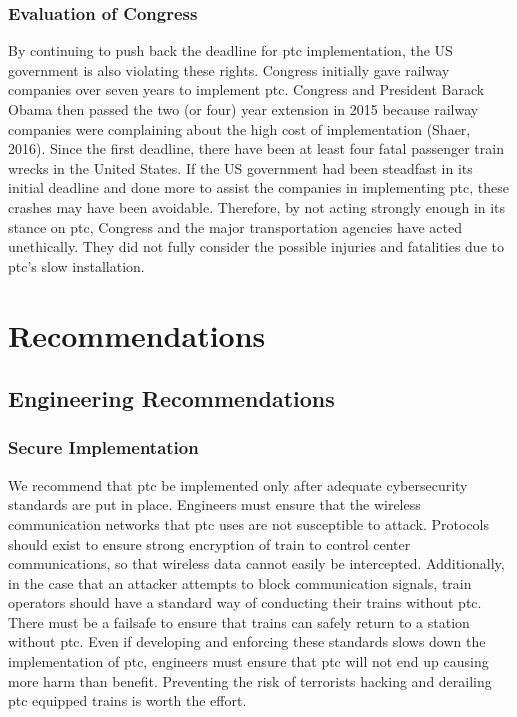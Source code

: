 \documentclass[11pt, titlepage]{article}
\begin{document}
\subsubsection{Evaluation of Congress}

By continuing to push back the deadline for \gls{ptc} implementation, the US
government is also violating these rights. Congress initially gave railway companies
over seven years to implement \gls{ptc}. Congress and President Barack Obama then
passed the two (or four) year extension in 2015 because railway companies were
complaining about the high cost of implementation (Shaer, 2016). Since the first
deadline, there have been at least four fatal passenger train wrecks in the United
States. If the US government had been steadfast in its initial deadline and done
more to assist the companies in implementing \gls{ptc}, these crashes may have been
avoidable. Therefore, by not acting strongly enough in its stance on \gls{ptc},
Congress and the major transportation agencies have acted unethically. They did not
fully consider the possible injuries and fatalities due to \gls{ptc}’s slow
installation.

\pagebreak

\section{Recommendations}

\subsection{Engineering Recommendations}

\subsubsection{Secure Implementation}

We recommend that \gls{ptc} be implemented only after adequate cybersecurity
standards are put in place. Engineers must ensure that the wireless communication
networks that \gls{ptc} uses are not susceptible to attack. Protocols should exist
to ensure strong encryption of train to control center communications, so that
wireless data cannot easily be intercepted. Additionally, in the case that an
attacker attempts to block communication signals, train operators should have a
standard way of conducting their trains without \gls{ptc}. There must be a failsafe
to ensure that trains can safely return to a station without \gls{ptc}. Even if
developing and enforcing these standards slows down the implementation of \gls{ptc},
engineers must ensure that \gls{ptc} will not end up causing more harm than benefit.
Preventing the risk of  terrorists hacking and derailing \gls{ptc} equipped trains
is worth the effort.
\end{document}
